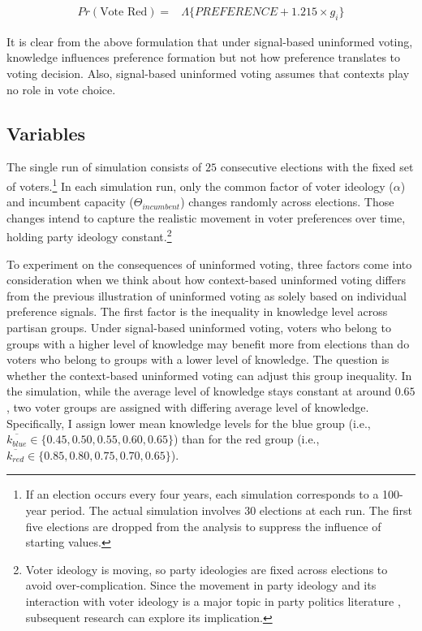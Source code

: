 \documentclass[letterpaper, 12pt]{article}
\begin{document}
    \begin{align*}
        Pr(\mbox{Vote Red}) = &\Lambda\{ PREFERENCE + 1.215 \times g_i \}
    \end{align*}
    
    \noindent It is clear from the above formulation that under signal-based uninformed voting, knowledge influences preference formation but not how preference translates to voting decision. Also, signal-based uninformed voting assumes that contexts play no role in vote choice.

    \subsection*{Variables}

    \par The single run of simulation consists of $25$ consecutive elections with the fixed set of voters.\footnote{If an election occurs every four years, each simulation corresponds to a 100-year period. The actual simulation involves $30$ elections at each run. The first five elections are dropped from the analysis to suppress the influence of starting values.} In each simulation run, only the common factor of voter ideology ($\alpha$) and incumbent capacity ($\Theta_{incumbent}$) changes randomly across elections. Those changes intend to capture the realistic movement in voter preferences over time, holding party ideology constant.\footnote{Voter ideology is moving, so party ideologies are fixed across elections to avoid over-complication. Since the movement in party ideology and its interaction with voter ideology is a major topic in party politics literature \citep{Downs1957anec, Kollman1992adpa, Adams2005unth}, subsequent research can explore its implication.}

    \par To experiment on the consequences of uninformed voting, three factors come into consideration when we think about how context-based uninformed voting differs from the previous illustration of uninformed voting as solely based on individual preference signals. The first factor is the inequality in knowledge level across partisan groups. Under signal-based uninformed voting, voters who belong to groups with a higher level of knowledge may benefit more from elections than do voters who belong to groups with a lower level of knowledge. The question is whether the context-based uninformed voting can adjust this group inequality. In the simulation, while the average level of knowledge stays constant at around $0.65$, two voter groups are assigned with differing average level of knowledge. Specifically, I assign lower mean knowledge levels for the blue group (i.e., $\overline{k_{blue}} \in \{0.45,0.50,0.55,0.60,0.65\}$) than for the red group (i.e., $\overline{k_{red}} \in \{0.85,0.80,0.75,0.70,0.65\}$).
\end{document}
